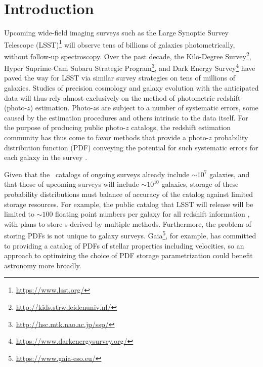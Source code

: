 \section{Introduction}


Upcoming wide-field imaging surveys such as the Large Synoptic Survey Telescope 
(LSST)\footnote{\url{https://www.lsst.org/}}\citep{ivezic_lsst:_2008} will 
observe tens of billions of galaxies photometrically, without follow-up 
spectroscopy.
Over the past decade, the Kilo-Degree 
Survey\footnote{\url{http://kids.strw.leidenuniv.nl/}}, Hyper Suprime-Cam 
Subaru Strategic Program\footnote{\url{http://hsc.mtk.nao.ac.jp/ssp/}}, and 
Dark Energy Survey\footnote{\url{https://www.darkenergysurvey.org/}} have paved 
the way for LSST via similar survey strategies on tens of millions of galaxies.
Studies of precision cosmology and galaxy evolution with the anticipated data 
will thus rely almost exclusively on the method of photometric redshift 
(photo-$z$) estimation.
Photo-$z$s are subject to a number of systematic errors, some caused by the 
estimation procedures and others intrinsic to the data itself.
For the purpose of producing public photo-$z$ catalogs, the redshift estimation 
community has thus come to favor methods that provide a photo-$z$ probability 
distribution function (PDF) conveying the potential for such systematic errors 
for each galaxy in the survey \citep{tanaka_photometric_2017, 
	de_jong_third_2017, sheldon_photometric_2012}.

Given that the \pz\ catalogs of ongoing surveys already include $\sim10^{7}$ 
galaxies, and that those of upcoming surveys will include $\sim10^{10}$ 
galaxies, storage of these probability distributions must balance of accuracy 
of the catalog against limited storage resources.
For example, the public catalog that LSST will release will be limited to 
$\sim100$ floating point numbers per galaxy for all redshift information 
\citep[Section 4.2.2]{juric_data_2017}, with plans to store \pz s derived by 
multiple methods.
Furthermore, the problem of storing PDFs is not unique to galaxy surveys.
Gaia\footnote{\url{https://www.gaia-eso.eu/}}, for example, has committed to 
providing a catalog of PDFs of stellar properties including velocities, so an 
approach to optimizing the choice of PDF storage parametrization could benefit 
astronomy more broadly.

